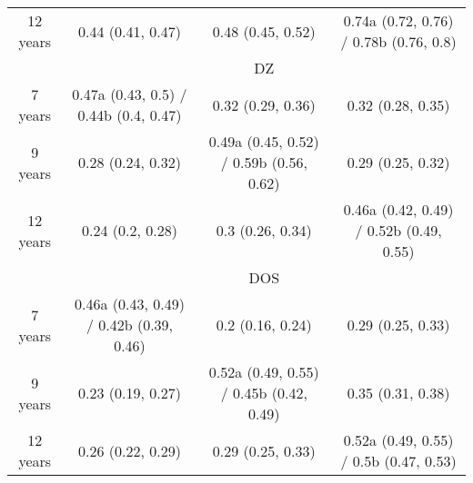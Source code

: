 \begin{table}[htbp]
\begin{tabular}{ccccc}
    12 years & \multicolumn{2}{c}{0.44 (0.41, 0.47)} & 0.48 (0.45, 0.52) & 0.74a (0.72, 0.76) / 0.78b (0.76, 0.8) \\
\cmidrule{1-4}          & \multicolumn{4}{c}{DZ} \\
    7 years & \multicolumn{2}{c}{0.47a (0.43, 0.5) / 0.44b (0.4, 0.47)} & 0.32 (0.29, 0.36) & 0.32 (0.28, 0.35) \\
    9 years & \multicolumn{2}{c}{0.28 (0.24, 0.32)} & 0.49a (0.45, 0.52) / 0.59b (0.56, 0.62) & 0.29 (0.25, 0.32) \\
    12 years & \multicolumn{2}{c}{0.24 (0.2, 0.28)} & 0.3 (0.26, 0.34) & 0.46a (0.42, 0.49) / 0.52b (0.49, 0.55) \\
\cmidrule{1-4}          & \multicolumn{4}{c}{DOS} \\
    7 years & \multicolumn{2}{c}{0.46a (0.43, 0.49) / 0.42b (0.39, 0.46)} & 0.2 (0.16, 0.24) & 0.29 (0.25, 0.33) \\
    9 years & \multicolumn{2}{c}{0.23 (0.19, 0.27)} & 0.52a (0.49, 0.55) / 0.45b (0.42, 0.49) & 0.35 (0.31, 0.38) \\
    12 years & \multicolumn{2}{c}{0.26 (0.22, 0.29)} & 0.29 (0.25, 0.33) & 0.52a (0.49, 0.55) / 0.5b (0.47, 0.53) \\
    \bottomrule
    \end{tabular}%
  \label{tab:addlabel}%
\end{table}%
